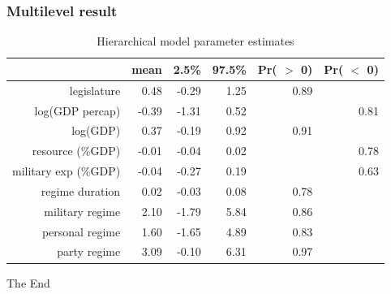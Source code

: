 \documentclass{beamer}
\begin{document}
\begin{frame}
\frametitle{Multilevel result}
\begin{table}[H]
\centering
\begin{tabular}{rrrrrr}
  \hline
 & mean & 2.5\% & 97.5\% & Pr( $>$ 0) & Pr( $<$ 0) \\ 
  \hline
legislature & 0.48 & -0.29 & 1.25 & 0.89 &  \\ 
  log(GDP percap) & -0.39 & -1.31 & 0.52 &  & 0.81 \\ 
  log(GDP) & 0.37 & -0.19 & 0.92 & 0.91 &  \\ 
  resource (\%GDP) & -0.01 & -0.04 & 0.02 &  & 0.78 \\ 
  military exp (\%GDP) & -0.04 & -0.27 & 0.19 &  & 0.63 \\ 
  regime duration & 0.02 & -0.03 & 0.08 & 0.78 &  \\ 
  military regime & 2.10 & -1.79 & 5.84 & 0.86 &  \\ 
  personal regime & 1.60 & -1.65 & 4.89 & 0.83 &  \\ 
  party regime & 3.09 & -0.10 & 6.31 & 0.97 &  \\ 
   \hline
\end{tabular}
\caption{Hierarchical model parameter estimates}
\label{tab:hierarchical_estimate}
\end{table}
\end{frame}


\begin{frame}
\Huge{\centerline{The End}}
\end{frame}
\end{document}
